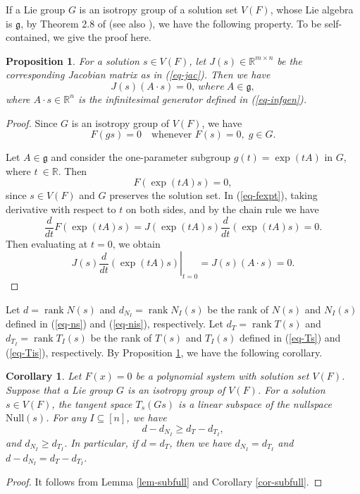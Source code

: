 \documentclass[reqno]{amsart}
\newtheorem{corollary}[theorem]{Corollary}
\newtheorem{proposition}[theorem]{Proposition}
\theoremstyle{definition}
\numberwithin{equation}{section}
\theoremstyle{remark}
\begin{document}
If a Lie group $G$ is an isotropy group of a solution set $V(F)$, whose Lie algebra is $\mathfrak{g}$, by Theorem 2.8 of \cite{olver93li} (see also \cite[Theorem 2.79]{olver95e}), we have the following property.
To be self-contained, we give the proof here.
\begin{proposition}\label{prop-jas}
For a solution $s\in V(F)$, let $J(s)\in \mathbb{R}^{m\times n}$ be the corresponding Jacobian matrix as in (\ref{eq-jac}). 
Then we have
$$J(s)(A\cdot s)=0,~where~A\in \mathfrak{g},$$
where $A\cdot s\in \mathbb{R}^n$ is the infinitesimal generator defined in (\ref{eq-infgen}).
\end{proposition}
\begin{proof}
Since $G$ is an isotropy group of $V(F)$, we have
$$
F(gs)=0 \quad \text{whenever } F(s)=0, \; g \in G.
$$

Let $A \in \mathfrak{g}$ and consider the one-parameter subgroup $g(t)=\exp(tA)$ in $G$, where $t~\in \mathbb{R}$. Then
\begin{equation}\label{eq-fexpt}
F(\exp(tA)s)=0,
\end{equation}
since $s \in V(F)$ and $G$ preserves the solution set.
In (\ref{eq-fexpt}), taking derivative with respect to $t$ on both sides, 
and by the chain rule we have
$$
\frac{d}{dt} F(\exp(tA)s)
=
J(\exp(tA)s) \frac{d}{dt}(\exp(tA)s)=0.
$$
Then evaluating at $t=0$, we obtain
$$
J(s) \left.\frac{d}{dt}(\exp(tA)s)\right|_{t=0}
= J(s)(A\cdot s)=0.
$$
\end{proof}


Let $d=\operatorname{rank}N(s)$ and $d_{N_I}=\operatorname{rank}N_I(s)$ be the rank of $N(s)$ and $N_I(s)$ defined in (\ref{eq-ns}) and (\ref{eq-nis}), respectively.
Let $d_T=\operatorname{rank}T(s)$ and $d_{T_I}=\operatorname{rank}T_I(s)$ be the rank of $T(s)$ and $T_I(s)$ defined in (\ref{eq-Ts}) and (\ref{eq-Tis}), respectively.
By Proposition \ref{prop-jas}, we have the following corollary.
\begin{corollary}\label{cor-tti}
Let $F(x)=0$ be a polynomial system with solution set $V(F)$. Suppose that a Lie group $G$ is an isotropy group of $V(F)$. For a solution $s\in V(F)$, the tangent space $T_s (Gs)$ is a linear subspace of the nullspace $\mathrm{Null}(s)$. For any $I\subseteq [n]$, we have
\begin{equation}\label{eq-dnt}
d-d_{N_I}\geq d_T-d_{T_I},
\end{equation}
and $d_{N_I}\geq d_{T_I}$.
In particular, if $d=d_T$, then we have $d_{N_I}= d_{T_I}$ and $d-d_{N_I}= d_T-d_{T_I}$.
\end{corollary}
\begin{proof}
It follows from Lemma \ref{lem-subfull} and Corollary \ref{cor-subfull}.
\end{proof}
\end{document}
